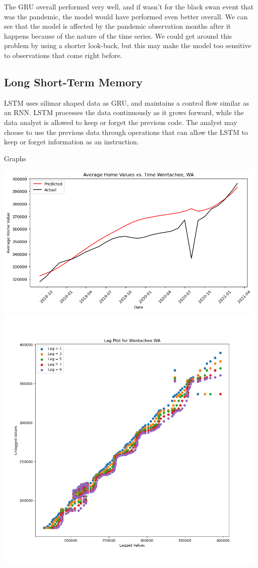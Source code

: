 \documentclass{article}
\begin{document}
	The GRU overall performed very well, and if wasn't for the black swan event that was the pandemic, the model would have performed even 
	better overall. We can see that the model is affected by the pandemic observation months after it happens because of the nature of the 
	time series. We could get around this problem by using a shorter look-back, but this may make the model too sensitive to observations that 
	come right before. 
	
	\subsection{Long Short-Term Memory}
	
	LSTM uses silimar shaped data as GRU, and maintains a control flow similar as an RNN. LSTM processes the data continuously as it grows 
	forward, while the data analyst is allowed to keep or forget the previous code. The analyst may choose to use the previous data through
	operations that can allow the LSTM to keep or forget information as an instruction.

	Graphs
	
	\includegraphics[scale = 0.4]{../plots/wentachee_1d_lstm.png}
	\includegraphics[scale = 0.4]{../plots/wentachee_lag.png}
\end{document}
